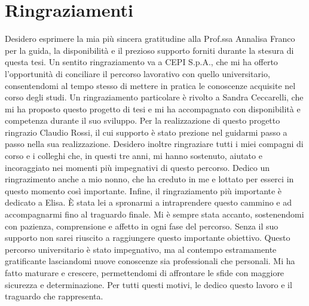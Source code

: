 \documentclass[12pt,a4paper,openright,twoside]{book}
\renewenvironment{acknowledgements}
  {\chapter*{Ringraziamenti}}
  {}
\begin{document}
\begin{acknowledgements}
    Desidero esprimere la mia più sincera gratitudine alla Prof.ssa Annalisa Franco per la guida,
    la disponibilità e il prezioso supporto forniti durante la stesura di questa tesi.
    Un sentito ringraziamento va a CEPI S.p.A., che mi ha offerto l'opportunità di conciliare
    il percorso lavorativo con quello universitario, consentendomi al tempo stesso di mettere in pratica
    le conoscenze acquisite nel corso degli studi.
    Un ringraziamento particolare è rivolto a Sandra Ceccarelli, che mi ha proposto questo progetto di tesi
    e mi ha accompagnato con disponibilità e competenza durante il suo sviluppo.
    Per la realizzazione di questo progetto ringrazio Claudio Rossi,
    il cui supporto è stato prezione nel guidarmi passo a passo nella sua realizzazione.
    Desidero inoltre ringraziare tutti i miei compagni di corso e i colleghi che, in questi tre anni, mi hanno sostenuto,
    aiutato e incoraggiato nei momenti più impegnativi di questo percorso.
    Dedico un ringrazimento anche a mio nonno, che ha creduto in me e lottato per esserci in questo momento così importante.
    Infine, il ringraziamento più importante è dedicato a Elisa. È stata lei a spronarmi a intraprendere questo cammino
    e ad accompagnarmi fino al traguardo finale. Mi è sempre stata accanto, sostenendomi con pazienza,
    comprensione e affetto in ogni fase del percorso. Senza il suo supporto non sarei riuscito a raggiungere
    questo importante obiettivo.
    Questo percorso universitario è stato impegnativo, ma al contempo estramamente gratificante
    lasciandomi nuove conoscenze sia professionali che personali. Mi ha fatto
    maturare e crescere, permettendomi di affrontare le sfide con maggiore sicurezza e determinazione.
    Per tutti questi motivi, le dedico questo lavoro e il traguardo che rappresenta.
\end{acknowledgements}
\end{document}
